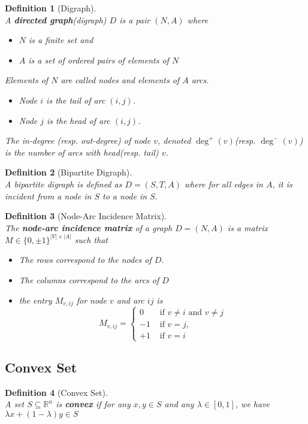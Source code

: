 \documentclass[12pt]{article}
\newtheorem{definition}{Definition}[section]
\theoremstyle{definition}
\begin{document}
\begin{definition}[Digraph]
\hfill\\\normalfont A \textbf{directed graph}(digraph) $D$ is a pair $(N,A)$ where
\begin{itemize}
  \item $N$ is a finite set and
  \item $A$ is a set of ordered pairs of elements of $N$
\end{itemize}
Elements of $N$ are called nodes and elements of $A$ arcs.
\begin{itemize}
  \item Node $i$ is the tail of arc $(i,j)$.
  \item Node $j$ is the head of arc $(i,j)$.
\end{itemize}
The in-degree (resp. out-degree) of node $v$, denoted $\deg^+(v)$(resp. $\deg^-(v)$) is the number of arcs with head(resp. tail) $v$.
\end{definition}
\begin{definition}[Bipartite Digraph]
\hfill\\\normalfont A bipartite digraph is defined as $D=(S,T,A)$ where for all edges in $A$, it is incident from a node in $S$ to a node in $S$.
\end{definition}
\begin{definition}[Node-Arc Incidence Matrix]
\hfill\\\normalfont The \textbf{node-arc incidence matrix} of a graph $D=(N,A)$ is a matrix $M\in\{0,\pm 1\} ^{|V|\times |A|}$ such that
\begin{itemize}
  \item The rows correspond to the nodes of $D$.
  \item The columns correspond to the arcs of $D$
  \item the entry $M_{v,ij}$ for node $v$ and arc $ij$ is
  \[
M_{v,ij} = \begin{cases}
0&\text{ if } v\neq i \text{ and } v\neq j\\
-1&\text{ if } v=j,\\
+1&\text{ if } v=i
\end{cases}
  \]
\end{itemize}
\end{definition}
\subsection{Convex Set}
\begin{definition}[Convex Set]
\hfill\\\normalfont A set $S\subseteq\mathbb{R}^n$ is \textbf{convex} if for any $x,y\in S$ and any $\lambda\in[0,1]$, we have $\lambda x+(1-\lambda)y\in S$
\end{definition}
\end{document}
